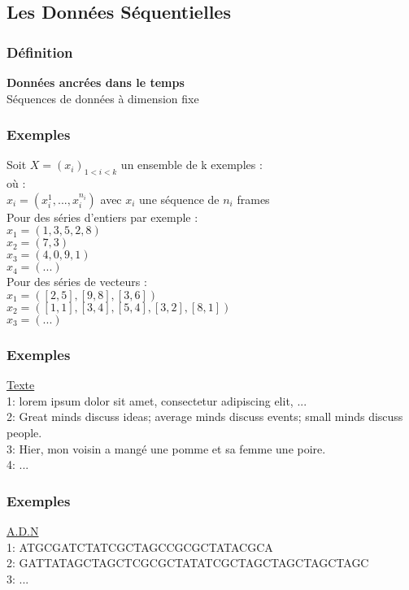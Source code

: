 \subsection{Les Données Séquentielles}

\begin{frame}
  \frametitle{Définition}
  \begin{center}
    \textbf{Données ancrées dans le temps} \\
    $\;$ \\
    Séquences de données à dimension fixe
  \end{center}
\end{frame}

\begin{frame}
  \frametitle{Exemples}
  Soit $X=(x_i)_{1<i<k}$ un ensemble de k exemples : \\
  où : \\
  $x_i = (x_{i}^1 , ... , x_{i}^{n_i})$ avec $x_i$ une séquence de $n_i$ frames \\
  \newline
  Pour des séries d'entiers par exemple : \\
  $x_1 = (1,3,5,2,8)$ \\
  $x_2 = (7,3)$ \\
  $x_3 = (4,0,9,1)$ \\
  $x_4 = (...)$ \\
  \newline
  Pour des séries de vecteurs : \\
  $x_1 = ([2,5],[9,8],[3,6])$ \\
  $x_2 = ([1,1],[3,4],[5,4],[3,2],[8,1])$ \\
  $x_3 = (...)$ 
\end{frame}

\begin{frame}
  \frametitle{Exemples}
  \underline{Texte} \\
  1: lorem ipsum dolor sit amet, consectetur adipiscing elit, ... \\
  2: Great minds discuss ideas; average minds discuss events; small minds discuss people. \\
  3: Hier, mon voisin a mangé une pomme et sa femme une poire. \\
  4: ...
\end{frame}

\begin{frame}
  \frametitle{Exemples}
  \underline{A.D.N} \\
  1: ATGCGATCTATCGCTAGCCGCGCTATACGCA \\
  2: GATTATAGCTAGCTCGCGCTATATCGCTAGCTAGCTAGCTAGC \\
  3: ...
\end{frame}

